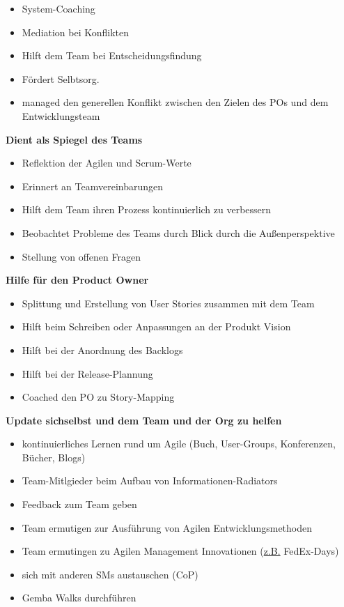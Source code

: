 \begin{itemize}
  \item System-Coaching
  \item Mediation bei Konflikten
  \item Hilft dem Team bei Entscheidungsfindung
  \item Fördert Selbtsorg.
  \item managed den generellen Konflikt zwischen den Zielen des POs und dem Entwicklungsteam
\end{itemize}

\textbf{Dient als Spiegel des Teams}

\begin{itemize}
  \item Reflektion der Agilen und Scrum-Werte
  \item Erinnert an Teamvereinbarungen
  \item Hilft dem Team ihren Prozess kontinuierlich zu verbessern
  \item Beobachtet Probleme des Teams durch Blick durch die Außenperspektive
  \item Stellung von offenen Fragen
\end{itemize}


\textbf{Hilfe für den Product Owner}

\begin{itemize}
  \item Splittung und Erstellung von User Stories zusammen mit dem Team
  \item Hilft beim Schreiben oder Anpassungen an der Produkt Vision
  \item Hilft bei der Anordnung des Backlogs
  \item Hilft bei der Release-Plannung
  \item Coached den PO zu Story-Mapping
\end{itemize}


\textbf{Update sichselbst und dem Team und der Org zu helfen}

\begin{itemize}
  \item kontinuierliches Lernen rund um Agile (Buch, User-Groups, Konferenzen, Bücher, Blogs)
  \item Team-Mitlgieder beim Aufbau von Informationen-Radiators
  \item Feedback zum Team geben
  \item Team ermutigen zur Ausführung von Agilen Entwicklungsmethoden
  \item Team ermutingen zu Agilen Management Innovationen (\uline{z.B.} FedEx-Days)
  \item sich mit anderen SMs austauschen (CoP)
  \item Gemba Walks durchführen
\end{itemize}



